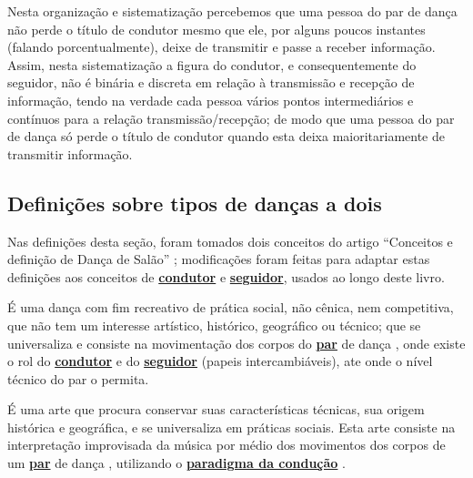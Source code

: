 \begin{description}
\begin{itemize}
\end{itemize}

    Nesta organização e sistematização percebemos que 
    uma pessoa do par de dança não perde o título de condutor mesmo que ele, por alguns poucos
    instantes (falando porcentualmente), deixe de transmitir e passe  
    a receber informação.
    Assim, nesta sistematização a figura do condutor, e consequentemente do seguidor, 
    não é binária e discreta em relação à transmissão e recepção de informação, tendo na verdade 
    cada pessoa vários pontos intermediários e contínuos para a relação transmissão/recepção; 
    de modo que uma pessoa do par de dança só perde o título de condutor quando esta
    deixa maioritariamente de transmitir informação. 
\end{description}
\subsection{Definições sobre tipos de danças a dois}

Nas definições desta seção, foram tomados dois conceitos do artigo 
``Conceitos e definição de Dança de Salão'' \cite{Zamoner2012};
modificações foram feitas para adaptar estas definições aos conceitos de 
\hyperref[def:Condutor]{\textbf{condutor}} e \hyperref[def:Seguidor]{\textbf{seguidor}}, 
usados ao longo deste livro.

\begin{definition}
\label{def:DancaSocial} 
É uma dança com fim recreativo de prática social, não cênica, nem competitiva, 
que não tem um interesse artístico, histórico, geográfico ou técnico; 
que se universaliza e consiste na movimentação dos corpos do \hyperref[def:Par]{\textbf{par}} de dança  \cite{Zamoner2012}, 
onde existe o rol do \hyperref[def:Condutor]{\textbf{condutor}} 
e do \hyperref[def:Seguidor]{\textbf{seguidor}} (papeis intercambiáveis), 
ate onde o nível técnico do par o permita.
\end{definition}

\begin{definition}
\label{def:DancaSalao}  
É uma arte que procura conservar suas características técnicas, 
sua origem histórica e geográfica, e se universaliza em práticas sociais. 
Esta arte consiste na interpretação improvisada da música por médio dos movimentos 
dos corpos de um \hyperref[def:Par]{\textbf{par}} de dança \cite{Zamoner2012}, 
utilizando o \hyperref[def:ParadigmaConducao]{\textbf{paradigma da condução}} .
\end{definition}

